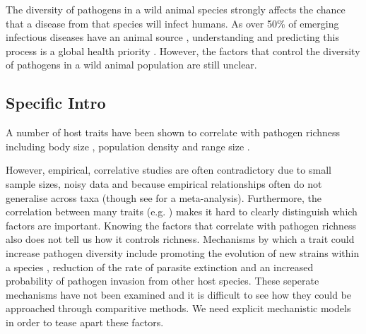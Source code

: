 
The diversity of pathogens in a wild animal species strongly affects the chance that a disease from that species will infect humans.
As over 50\% of emerging infectious diseases have an animal source  \cite{jones2008global, smith2014global}, understanding and predicting this process is a global health priority  \cite{taylor2001risk}.
However, the factors that control the diversity of pathogens in a wild animal population are still unclear\cite{metcalf2015five}.




\subsection{Specific Intro}


A number of host traits have been shown to correlate with pathogen richness including body size \cite{kamiya2014determines, arneberg2002host}, population density \cite{nunn2003comparative, arneberg2002host} and range size \cite{bordes2011impact, kamiya2014determines}.






However, empirical, correlative studies are often contradictory due to small sample sizes, noisy data and because empirical relationships often do not generalise across taxa (though see \cite{kamiya2014determines} for a meta-analysis).
Furthermore, the correlation between many traits (e.g. \cite{nunn2015infectious}) makes it hard to clearly distinguish which factors are important.
Knowing the factors that correlate with pathogen richness also does not tell us how it controls richness. 
Mechanisms by which a trait could increase pathogen diversity include promoting the evolution of new strains within a species \cite{buckee2004effects}, reduction of the rate of parasite extinction and an increased probability of pathogen invasion from other host species.
These seperate mechanisms have not been examined and it is difficult to see how they could be approached through comparitive methods.
We need explicit mechanistic models in order to tease apart these factors.





